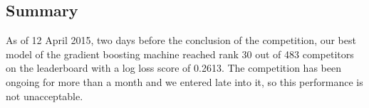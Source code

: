 \documentclass{article}\usepackage[]{graphicx}\usepackage[]{color}
\begin{document}
                                                                                                                                                                                                                                                                                                                                                                                                                                                                                                                                                                                                \subsection{Summary}
                                                                                                                                                                                                                                                                                                                                                                                                                                                                                                                                                                                                As of 12 April 2015, two days before the conclusion of the competition, our best model of the gradient boosting machine reached rank 30 out of 483 competitors on the leaderboard with a log loss score of 0.2613. The competition has been ongoing for more than a month and we entered late into it, so this performance is not unacceptable.
                                                                                                                                                                                                                                                                                                                                                                                                                                                                                                                                                                                                
\end{document}
